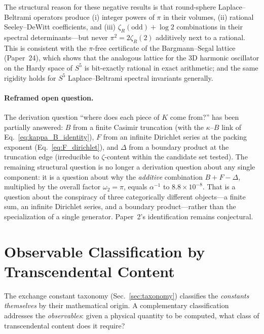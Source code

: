 \documentclass[aps,pra,twocolumn,superscriptaddress,longbibliography]{revtex4-2}
\begin{document}
The structural reason for these negative results is that
round-sphere Laplace--Beltrami operators produce (i) integer powers
of $\pi$ in their volumes, (ii) rational Seeley--DeWitt
coefficients, and (iii) $\zeta_R(\mathrm{odd}) + \log 2$ combinations
in their spectral determinants---but never $\pi^2 = 2\zeta_R(2)$
additively next to a rational.  This is consistent with the
$\pi$-free certificate of the Bargmann--Segal lattice
(Paper~24), which shows that the
analogous lattice for the 3D harmonic oscillator on the Hardy
space of $S^5$ is bit-exactly rational in exact arithmetic; and the
same rigidity holds for $S^5$ Laplace--Beltrami spectral invariants
generally.

\paragraph{Reframed open question.}
The derivation question ``where does each piece of $K$ come from?''
has been partially answered: $B$ from a finite Casimir truncation
(with the $\kappa$--$B$ link of Eq.~\ref{eq:kappa_B_identity}), $F$
from an infinite Dirichlet series at the packing exponent
(Eq.~\ref{eq:F_dirichlet}), and $\Delta$ from a boundary product at
the truncation edge (irreducible to $\zeta$-content within the
candidate set tested).  The remaining structural question is no
longer a derivation question about any single component: it is a
question about why the \emph{additive} combination
$B + F - \Delta$, multiplied by the overall factor $\omega_2 = \pi$,
equals $\alpha^{-1}$ to $8.8 \times 10^{-8}$.  That is a question
about the conspiracy of three categorically different objects---a
finite sum, an infinite Dirichlet series, and a boundary
product---rather than the specialization of a single generator.
Paper~2's identification remains conjectural.



\section{Observable Classification by Transcendental Content}
\label{sec:observable_classification}

The exchange constant taxonomy (Sec.~\ref{sec:taxonomy}) classifies the
\emph{constants themselves} by their mathematical origin.  A complementary
classification addresses the \emph{observables}: given a physical quantity
to be computed, what class of transcendental content does it require?
\end{document}
